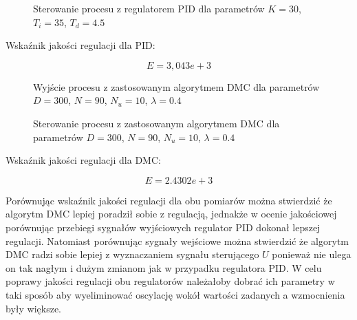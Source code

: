 \begin{figure}[H]
\centering

\caption{Sterowanie procesu z regulatorem PID dla parametrów $K = 30$,  $T_i = 35$,  $T_d = 4.5$}
\end{figure}

Wskaźnik jakości regulacji dla PID:

\begin{equation}
E = 3,043e+3
\end{equation}

\begin{figure}[H]
\centering

\caption{Wyjście procesu z zastosowanym algorytmem DMC dla parametrów $D = 300$, $N = 90$, $N_u = 10$, $\lambda= 0.4$}
\end{figure}

\begin{figure}[H]
\centering

\caption{Sterowanie procesu z zastosowanym algorytmem DMC dla parametrów $D = 300$, $N = 90$, $N_u = 10$, $\lambda= 0.4$}
\end{figure}

Wskaźnik jakości regulacji dla DMC:

\begin{equation}
E = 2.4302e+3
\end{equation}

Porównując wskaźnik jakości regulacji dla obu pomiarów można stwierdzić że algorytm DMC lepiej poradził sobie z regulacją, jednakże w ocenie jakościowej porównując przebiegi sygnałów  wyjściowych regulator PID dokonał lepszej regulacji. Natomiast porównując sygnały wejściowe można stwierdzić że algorytm DMC radzi sobie lepiej z wyznaczaniem sygnału sterującego $U$
ponieważ nie ulega on tak nagłym i dużym zmianom jak w przypadku regulatora PID. W celu poprawy jakości regulacji obu regulatorów należałoby dobrać ich parametry w taki sposób aby wyeliminować oscylację wokół wartości zadanych a wzmocnienia były większe. 
